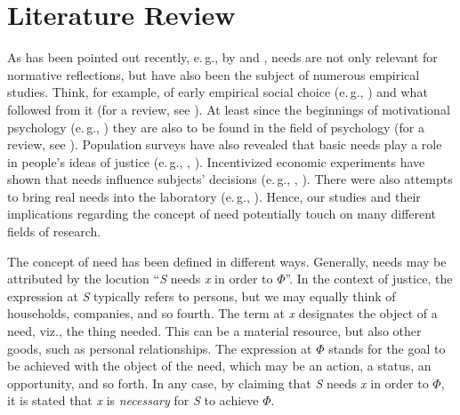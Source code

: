 \documentclass[egregdoesnotlikesansseriftitles]{scrartcl}
\begin{document}
\section{Literature Review}\label{sec:literature}
As has been pointed out recently, e.\,g., by \cite{kittel_impact_2020} and \cite{bauer_need_2022}, needs are not only relevant for normative reflections, but have also been the subject of numerous empirical studies.
Think, for example, of early empirical social choice (e.\,g., \citealt{yaari_dividing_1984}) and what followed from it (for a review, see \citealt{gaertner_empirical_2012}).
At least since the beginnings of motivational psychology (e.\,g., \citealt{williams_multi-dimensional_1989}) they are also to be found in the field of psychology (for a review, see \citealt{diederich_identifying_2020}).
Population surveys have also revealed that basic needs play a role in people's ideas of justice (e.\,g., \citealt{reeskens_equity_2013}, \citealt{hulle_measuring_2018}).
Incentivized economic experiments have shown that needs influence subjects' decisions (e.\,g., \citealt{branas_poverty_2006}, \citealt{cappelen_needs_2013}).
There were also attempts to bring real needs into the laboratory (e.\,g., \citealt{kause_selfish_2018}).
Hence, our studies and their implications regarding the concept of need potentially touch on many different fields of research.

The concept of need has been defined in different ways.
Generally, needs may be attributed by the locution ``\textit{S} needs \textit{x} in order to $\Phi$''.
In the context of justice, the expression at \textit{S} typically refers to persons, but we may equally think of households, companies, and so fourth.
The term at \textit{x} designates the object of a need, viz., the thing needed.
This can be a material resource, but also other goods, such as personal relationships.
The expression at $\Phi$ stands for the goal to be achieved with the object of the need, which may be an action, a status, an opportunity, and so forth.
In any case, by claiming that \textit{S} needs \textit{x} in order to $\Phi$, it is stated that \textit{x} is \textit{necessary} for \textit{S} to achieve $\Phi$.
\end{document}
